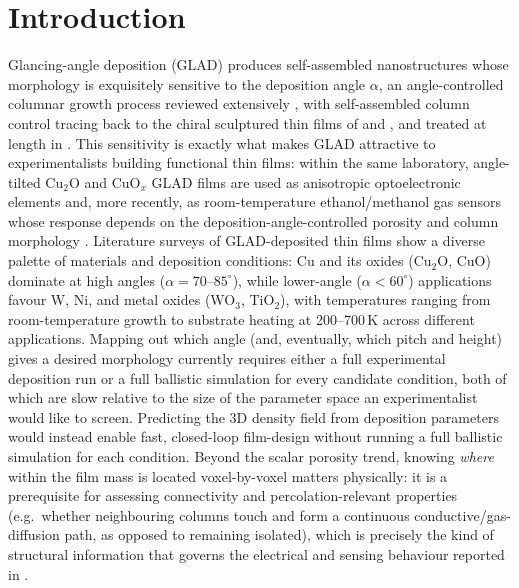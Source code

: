 \documentclass[aip,amsmath,amssymb,reprint]{revtex4-1}
\renewcommand{\ang}{\ensuremath{\alpha}} %
\begin{document}
\section{Introduction}
\label{sec:intro}

Glancing-angle deposition (GLAD) produces self-assembled nanostructures
whose morphology is exquisitely sensitive to the deposition angle $\ang$,
an angle-controlled columnar growth process reviewed extensively
\citep{hawkeye2014,barranco2016,hawkeye2007}, with self-assembled column
control tracing back to the chiral sculptured thin films of
\citet{robbie1996nature} and \citet{brett2008science}, and treated at
length in \citet{lakhtakia2005stf}.
This sensitivity is exactly what makes GLAD attractive to
experimentalists building functional thin films: within the same
laboratory, angle-tilted Cu$_2$O and CuO$_x$ GLAD films are used as
anisotropic optoelectronic elements \citep{chaffar2018,chaffar2019}
and, more recently, as room-temperature ethanol/methanol gas sensors
whose response depends on the deposition-angle-controlled porosity
and column morphology \citep{benamor2026}.
Literature surveys of GLAD-deposited thin films show a diverse palette
of materials and deposition conditions: Cu and its oxides (Cu$_2$O, CuO)
dominate at high angles ($\ang = 70\text{--}85^{\circ}$), while lower-angle
($\ang < 60^{\circ}$) applications favour W, Ni, and metal oxides (WO$_3$, TiO$_2$),
with temperatures ranging from room-temperature growth to substrate heating
at 200--700\,K across different applications.
Mapping out which angle (and, eventually, which pitch and height)
gives a desired morphology currently requires either a full
experimental deposition run or a full ballistic simulation for every
candidate condition, both of which are slow relative to the size of
the parameter space an experimentalist would like to screen.
Predicting the 3D density field from deposition parameters would
instead enable fast, closed-loop film-design without running a full
ballistic simulation for each condition.
Beyond the scalar porosity trend, knowing \emph{where} within the
film mass is located voxel-by-voxel matters physically: it is a
prerequisite for assessing connectivity and percolation-relevant
properties (e.g.\ whether neighbouring columns touch and form a
continuous conductive/gas-diffusion path, as opposed to remaining
isolated), which is precisely the kind of structural information
that governs the electrical and sensing behaviour reported in
\citep{chaffar2019,benamor2026}.
\end{document}
